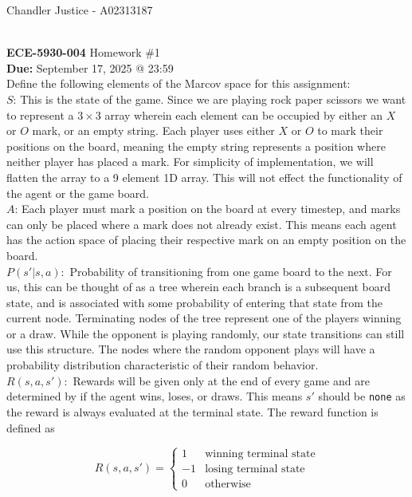 \documentclass[10pt]{article}
\newcommand{\1}{\mathbb{1}}
\begin{document}
\begin{flushright}
Chandler Justice - A02313187
\end{flushright}
\noindent \underline{\hspace{3in}}\\
\textbf{ECE-5930-004} Homework \#1 \\
\textbf{Due:} September 17, 2025 @ 23:59\\

Define the following elements of the Marcov space for this assignment:\\

$S$: This is the state of the game. Since we are playing rock paper scissors we want to represent a $3 \times 3$ array wherein each element can be occupied by either an $X$ or $O$ mark, or an empty string. Each player uses either $X$ or $O$ to mark their positions on the board, meaning the empty string represents a position where neither player has placed a mark. For simplicity of implementation, we will flatten the array to a 9 element 1D array. This will not effect the functionality of the agent or the game board.\\

$A$: Each player must mark a position on the board at every timestep, and marks can only be placed where a mark does not already exist. This means each agent has the action space of placing their respective mark on an empty position on the board.\\

$P(s'|s,a):$ Probability of transitioning from one game board to the next. For us, this can be thought of as a tree wherein each branch is a subsequent board state, and is associated with some probability of entering that state from the current node. Terminating nodes of the tree represent one of the players winning or a draw. While the opponent is playing randomly, our state transitions can still use this structure. The nodes where the random opponent plays will have a probability distribution characteristic of their random behavior.\\

$R(s, a, s'):$ Rewards will be given only at the end of every game and are determined by if the agent wins, loses, or draws. This means $s'$ should be \texttt{none} as the reward is always evaluated at the terminal state. The reward function is defined as

\[R(s, a, s') = \begin{cases}
    1 & \text{winning terminal state}\\
    -1 & \text{losing terminal state}\\
    0 & \text{otherwise}
\end{cases}\]
\end{document}
